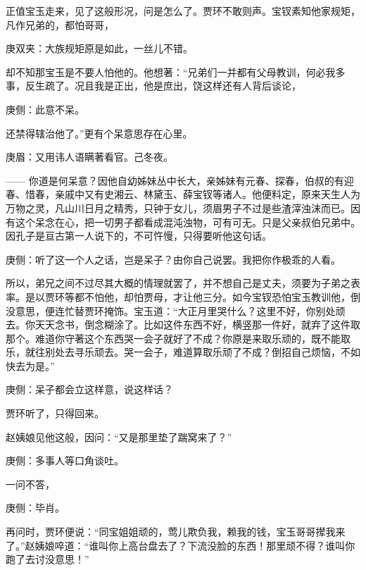 \begin{parag}
    正值宝玉走来，见了这般形况，问是怎么了。贾环不敢则声。宝钗素知他家规矩，凡作兄弟的，都怕哥哥，\begin{note}庚双夹：大族规矩原是如此，一丝儿不错。\end{note}却不知那宝玉是不要人怕他的。他想著：“兄弟们一并都有父母教训，何必我多事，反生疏了。况且我是正出，他是庶出，饶这样还有人背后谈论，\begin{note}庚侧：此意不呆。\end{note}还禁得辖治他了。”更有个呆意思存在心里。\begin{note}庚眉：又用讳人语瞒著看官。己冬夜。\end{note}—— 你道是何呆意？因他自幼姊妹丛中长大，亲姊妹有元春、探春，伯叔的有迎春、惜春，亲戚中又有史湘云、林黛玉、薛宝钗等诸人。他便料定，原来天生人为万物之灵，凡山川日月之精秀，只钟于女儿，须眉男子不过是些渣滓浊沫而已。因有这个呆念在心，把一切男子都看成混沌浊物，可有可无。只是父亲叔伯兄弟中。因孔子是亘古第一人说下的，不可忤慢，只得要听他这句话。\begin{note}庚侧：听了这一个人之话，岂是呆子？由你自己说罢。我把你作极乖的人看。\end{note}所以，弟兄之间不过尽其大概的情理就罢了，并不想自己是丈夫，须要为子弟之表率。是以贾环等都不怕他，却怕贾母，才让他三分。如今宝钗恐怕宝玉教训他，倒没意思，便连忙替贾环掩饰。宝玉道：“大正月里哭什么？这里不好，你别处顽去。你天天念书，倒念糊涂了。比如这件东西不好，横竖那一件好，就弃了这件取那个。难道你守著这个东西哭一会子就好了不成？你原是来取乐顽的，既不能取乐，就往别处去寻乐顽去。哭一会子，难道算取乐顽了不成？倒招自己烦恼，不如快去为是。”\begin{note}庚侧：呆子都会立这样意，说这样话？\end{note}贾环听了，只得回来。
\end{parag}


\begin{parag}
    赵姨娘见他这般，因问：“又是那里垫了踹窝来了？”\begin{note}庚侧：多事人等口角谈吐。\end{note}一问不答，\begin{note}庚侧：毕肖。\end{note}再问时，贾环便说：“同宝姐姐顽的，莺儿欺负我，赖我的钱，宝玉哥哥撵我来了。”赵姨娘啐道：“谁叫你上高台盘去了？下流没脸的东西！那里顽不得？谁叫你跑了去讨没意思！”
\end{parag}


